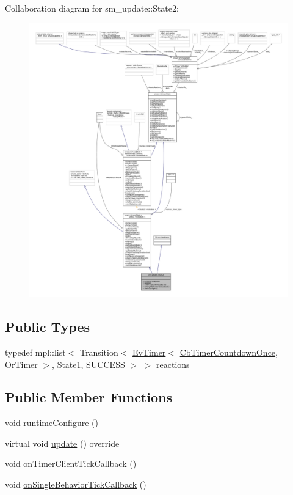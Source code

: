 Collaboration diagram for sm\+\_\+update\+:\+:State2\+:
\nopagebreak
\begin{figure}[H]
\begin{center}
\leavevmode
\includegraphics[width=350pt]{structsm__update_1_1State2__coll__graph}
\end{center}
\end{figure}
\subsection*{Public Types}
\begin{DoxyCompactItemize}
\item 
typedef mpl\+::list$<$ Transition$<$ \hyperlink{structcl__ros__timer__client_1_1EvTimer}{Ev\+Timer}$<$ \hyperlink{classcl__ros__timer__client_1_1CbTimerCountdownOnce}{Cb\+Timer\+Countdown\+Once}, \hyperlink{classsm__update_1_1OrTimer}{Or\+Timer} $>$, \hyperlink{structsm__update_1_1State1}{State1}, \hyperlink{structsmacc_1_1default__transition__tags_1_1SUCCESS}{S\+U\+C\+C\+E\+SS} $>$ $>$ \hyperlink{structsm__update_1_1State2_a6030dbce2602c3a49aae0a372e46e4df}{reactions}
\end{DoxyCompactItemize}
\subsection*{Public Member Functions}
\begin{DoxyCompactItemize}
\item 
void \hyperlink{structsm__update_1_1State2_a4b85c8a77894cc78f017da0de9e2bfa3}{runtime\+Configure} ()
\item 
virtual void \hyperlink{structsm__update_1_1State2_a395d9f5e248d78da06c0c375dd8cb1b6}{update} () override
\item 
void \hyperlink{structsm__update_1_1State2_a217fac4964c4905921e215805f8b80be}{on\+Timer\+Client\+Tick\+Callback} ()
\item 
void \hyperlink{structsm__update_1_1State2_a652c5a4944bcff8dcb237937b340b7dd}{on\+Single\+Behavior\+Tick\+Callback} ()
\end{DoxyCompactItemize}
